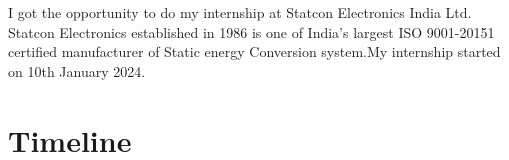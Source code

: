 I got the opportunity to do my internship at Statcon Electronics India Ltd.
Statcon Electronics established in 1986 is one of India's largest ISO
9001-20151 certified manufacturer of Static energy Conversion system.My
internship started on 10th January 2024.
\section{Timeline}